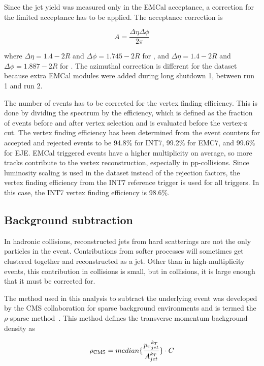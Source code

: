 Since the jet yield was measured only in the EMCal acceptance, a correction for the limited acceptance has to be applied. The acceptance correction is

\begin{equation}
    A = \frac{\Delta\eta \Delta\phi}{2\pi}
\end{equation}

where $\Delta\eta = 1.4 - 2R$ and $\Delta\phi = 1.745 - 2R$ for \pp, and $\Delta\eta = 1.4 - 2R$ and $\Delta\phi = 1.887 - 2R$ for
\pPb. The azimuthal correction is different for the \pPb dataset because extra EMCal modules were added during long shutdown 1, between run 1 and run 2.

The number of events has to be corrected for the vertex finding efficiency. This is done by dividing the spectrum by the efficiency, which is defined as the fraction of events before and after vertex selection and is evaluated before the vertex-z cut. The vertex finding efficiency has been determined from the event counters for accepted and rejected events to be 94.8$\%$ for INT7, 99.2$\%$ for EMC7, and 99.6$\%$ for EJE. EMCal triggered events have a higher multiplicity on average, so more tracks contribute to the vertex reconstruction, especially in pp-collisions. Since luminosity scaling is used in the \pPb dataset instead of the rejection factors, the vertex finding efficiency from the INT7 reference trigger is used for all triggers. In this case, the INT7 vertex finding efficiency is 98.6\%.

\subsection{Background subtraction}
\label{sec:backgroundSubtraction}

In hadronic collisions, reconstructed jets from hard scatterings are not the only particles in the event. Contributions from softer processes will sometimes get clustered together and reconstructed as a jet. Other than in high-multiplicity events, this contribution in \pp collisions is small, but in \pPb collisions, it is large enough that it must be corrected for.

The method used in this analysis to subtract the underlying event was developed by the CMS collaboration for sparse background environments and is termed the $\rho$-sparse method~\cite{CMS:2012rmf}. This method defines the transverse momentum background density as 

\begin{equation}
    \rho_{\text{CMS}} = median\{\frac{{\text{$p_{\mbox{\tiny T}}$}}_{jet}^{k_T}}{A_{jet}^{k_T}}\} \cdot C
\end{equation}

